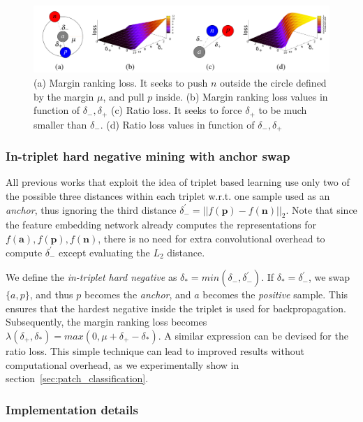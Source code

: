 \begin{figure}[t]
    \centering
    \includegraphics[scale=0.19]{main/chapter02/images/tfeat_losses.png}
    \caption{(a) Margin ranking loss. It seeks to push $n$ outside
  the circle defined by the margin $\mu$, and pull $p$ inside. (b)
  Margin ranking loss values in function of $\delta_{-},\delta_{+}$
  (c) Ratio loss. It seeks to force
  $\delta_{+}$ to be much smaller than $\delta_{-}$. (d)
  Ratio loss values in function of $\delta_{-},\delta_{+}$}
\label{fig:losses}
\end{figure}  


\subsubsection{In-triplet hard negative mining with anchor swap}

All previous works that exploit the idea of triplet based learning use only two of
the possible three distances within each triplet w.r.t. one
sample  used as an \textit{anchor}, thus ignoring the
third distance 
$\delta_{-}^{'} = ||f(\boldsymbol p)-f(\boldsymbol n)||_2.$ Note that
since the feature embedding network already computes the
representations for
$f(\boldsymbol a), f(\boldsymbol p), f(\boldsymbol n) $, there is no
need for extra convolutional overhead to compute
$\delta_{-}^{'}$ except
evaluating the $L_2$ distance.

We define the \textit{in-triplet hard negative} as
$\delta_{*} = min(\delta_{-},\delta_{-}^{'})$. If
$\delta_{*} = \delta_{-}^{'}$, we swap $\{a,p\}$, and thus $p$ becomes
the \textit{anchor}, and $a$ becomes the \textit{positive}
sample. This ensures that the hardest negative inside the triplet 
is used for backpropagation. Subsequently, the margin ranking loss
becomes $\lambda(\delta_+,\delta_*) = max(0, \mu
+\delta_+-\delta_*)$. A similar expression can be devised for the
ratio loss.  This simple technique can lead to improved
results without  computational overhead, as we experimentally show in section~\ref{sec:patch_classification}. 

\subsubsection{Implementation details}

